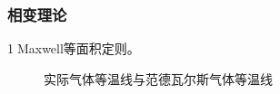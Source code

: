 \documentclass[12pt]{article}
\begin{document}
\subsubsection{相变理论}	
\noindent
\textcircled{1}Maxwell等面积定则。\\
\begin{figure}[H]
\centering
{}
\quad\quad\quad
{}
\caption{实际气体等温线与范德瓦尔斯气体等温线}
\end{figure}
\end{document}
